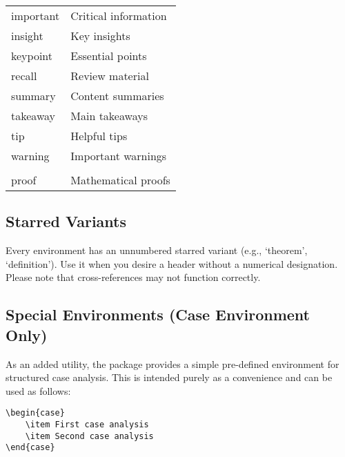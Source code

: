 \documentclass[10pt,letterpaper]{amsart}
\begin{document}
\begin{longtable}{>{\ttfamily}l>{\normalfont}p{}}
	important                       & Critical information                    \\
	insight                         & Key insights                            \\
	keypoint                        & Essential points                        \\
	recall                          & Review material                         \\
	summary                         & Content summaries                       \\
	takeaway                        & Main takeaways                          \\
	tip                             & Helpful tips                            \\
	warning                         & Important warnings                      \\
	\midrule
	\multicolumn{2}{l}{\textbf{Proof Environment}}                            \\
	\midrule
	proof                           & Mathematical proofs                     \\
\end{longtable}

\subsection{Starred Variants}

Every environment has an unnumbered starred variant (e.g., `theorem',
`definition'). Use it when you desire a header without a numerical designation.
Please note that cross-references may not function correctly.

\subsection{Special Environments (Case Environment Only)}

As an added utility, the package provides a simple pre-defined environment for
structured case analysis. This is intended purely as a convenience and can be
used as follows:

\begin{verbatim}
\begin{case}
    \item First case analysis
    \item Second case analysis
\end{case}
\end{verbatim}
\end{document}
